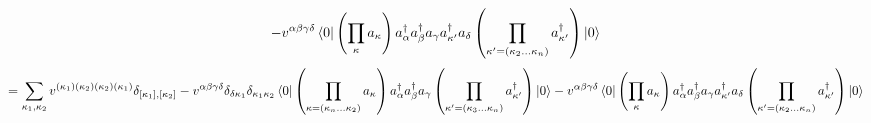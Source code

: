 \documentclass[12pt]{article}
\begin{document}
\begin{enumerate}
\begin{dmath}
    -v^{\alpha\beta\gamma\delta}
    \bra{0}\left(\prod_{\kappa}^{}a_{\kappa}\right)
    a^{\dag}_{\alpha}a^{\dag}_{\beta}a_{\gamma}a^{\dag}_{\kappa^{\prime}}a_{\delta}
    \left(\prod_{\kappa^{\prime}=\left(\kappa_{2}\dots\kappa_{n}\right)}^{}a^{\dag}_{\kappa^{\prime}}\right)\ket{0}
    \end{dmath}
    \begin{dmath}
    =\sum_{\kappa_{1},\kappa_{2}}
    v^{\left(\kappa_{1}\right)\left(\kappa_{2}\right)\left(\kappa_{2}\right)\left(\kappa_{1}\right)}\delta_{[\kappa_{1}],[\kappa_{2}]}
        -v^{\alpha\beta\gamma\delta}
        \delta_{\delta\kappa_{1}}\delta_{\kappa_{1}\kappa_{2}}
        \bra{0}\left(\prod_{\kappa=\left(\kappa_{n}\dots\kappa_{2}\right)}a_{\kappa}\right)
        a^{\dag}_{\alpha}a^{\dag}_{\beta}a_{\gamma}
        \left(\prod_{\kappa^{\prime}=\left(\kappa_{3}\dots\kappa_{n}\right)}a^{\dag}_{\kappa^{\prime}}\right)\ket{0}
    -v^{\alpha\beta\gamma\delta}
    \bra{0}\left(\prod_{\kappa}a_{\kappa}\right)
    a^{\dag}_{\alpha}a^{\dag}_{\beta}a_{\gamma}a^{\dag}_{\kappa^{\prime}}a_{\delta}
    \left(\prod_{\kappa^{\prime}=\left(\kappa_{2}\dots\kappa_{n}\right)}a^{\dag}_{\kappa^{\prime}}\right)\ket{0}
    \end{dmath}
    
\end{enumerate}
\end{document}
